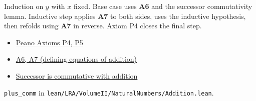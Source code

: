 \begin{remark*}
Induction on $y$ with $x$ fixed. Base case uses \textbf{A6} and the
successor commutativity lemma. Inductive step applies \textbf{A7} to both
sides, uses the inductive hypothesis, then refolds using \textbf{A7}
in reverse. Axiom P4 closes the final step.

\end{remark*}

\begin{dependencies}
\begin{itemize}
  \item \hyperref[ax:landau-peano]{Peano Axioms P4, P5}
  \item \hyperref[thm:landau-addition-exists-unique]{A6, A7 (defining equations of addition)}
  \item \hyperref[lem:landau-succ-comm]{Successor is commutative with addition}
\end{itemize}

\end{dependencies}

\begin{remark*}
\texttt{plus\_comm} in
\texttt{lean/LRA/VolumeII/NaturalNumbers/Addition.lean}.
\end{remark*}

\clearpage
